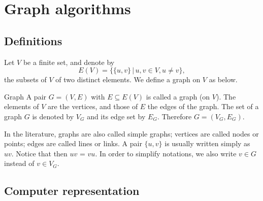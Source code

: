 \chapter{Graph algorithms}

\section{Definitions}

Let $V$ be a finite set, and denote by
\[
E(V) = \lbrace \lbrace u, v \rbrace \,|\, u, v \in V, u \ne v \rbrace,
\]
the subsets of $V$ of two distinct elements.
We define a graph on $V$ as below.
\begin{defn}{Graph}
A pair $G = (V,E)$ with $E \subseteq E(V)$ is called a graph (on $V$).
The elements of $V$ are the vertices, and those of $E$ the edges of the graph.
The  set of a graph $G$ is denoted by $V_G$ and its edge set by $E_G$.
Therefore $G = (V_G, E_G)$.
\end{defn}

In the literature, graphs are also called simple graphs; vertices are called nodes or points; edges are called lines or links.
A pair $\lbrace u, v \rbrace$ is usually written simply as $uv$.
Notice that then $uv$ = $vu$.
In order to simplify notations, we also write $v \in G$ instead of $v \in V_G$.

\section{Computer representation}


